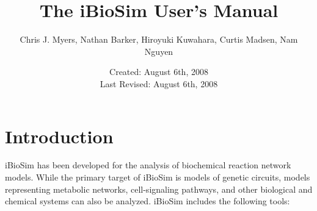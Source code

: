 \documentclass[titlepage,11pt]{article}
\title{The iBioSim User's Manual}
\author{Chris J. Myers, Nathan Barker, Hiroyuki Kuwahara, Curtis
  Madsen, Nam Nguyen}
\date{Created: August 6th, 2008\\
  Last Revised: August 6th, 2008
}
\begin{document}
\maketitle

  
\tableofcontents

\clearpage
  

\section{Introduction}

\noindent
iBioSim has been developed for the analysis of biochemical
reaction network models.  While the primary target of iBioSim is
models of genetic circuits, models representing metabolic
networks, cell-signaling pathways, and other biological and
chemical systems can also be analyzed.  iBioSim includes the
following tools: 
\end{document}
